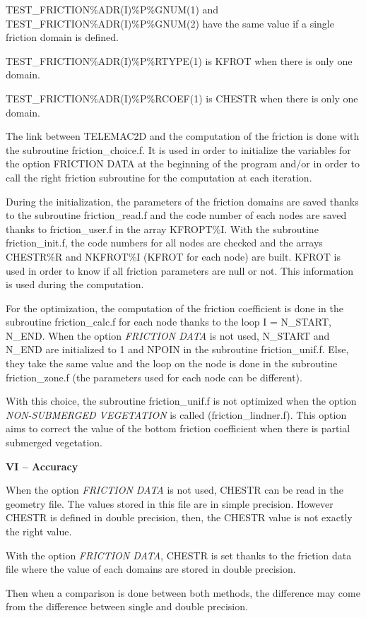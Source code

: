  TEST\_FRICTION\%ADR(I)\%P\%GNUM(1) and TEST\_FRICTION\%ADR(I)\%P\%GNUM(2) have the same value if a single friction domain is defined.

 TEST\_FRICTION\%ADR(I)\%P\%RTYPE(1) is KFROT   when there is only one domain.

 TEST\_FRICTION\%ADR(I)\%P\%RCOEF(1) is CHESTR when there is only one domain.



 The link between TELEMAC2D and the computation of the friction is done with the subroutine friction\_choice.f. It is used in order to initialize the variables for the option FRICTION  DATA at the beginning of the program and/or in order to call the right friction subroutine for the computation at each iteration.

 \textbf{}

 During the initialization, the parameters of the friction domains are saved thanks to the subroutine friction\_read.f and the code number of each nodes are saved thanks to friction\_user.f in the array KFROPT\%I. With the subroutine friction\_init.f, the code numbers for all nodes are checked and the arrays CHESTR\%R and NKFROT\%I (KFROT for each node) are built. KFROT is used in order to know if all friction parameters are null or not. This information is used during the computation.

 \textbf{}

 For the optimization, the computation of the friction coefficient is done in the subroutine friction\_calc.f for each node thanks to the loop I = N\_START, N\_END. When the option \textit{FRICTION DATA} is not used, N\_START and N\_END are initialized to 1 and NPOIN in the subroutine friction\_unif.f. Else, they take the same value and the loop on the node is done in the subroutine friction\_zone.f  (the  parameters used for each node can be different).

 With this choice, the subroutine friction\_unif.f is not optimized when the option \textit{NON-SUBMERGED VEGETATION} is called (friction\_lindner.f). This option aims to correct the value of the bottom friction coefficient when there is partial submerged vegetation.

 \textbf{VI -- Accuracy}

 When the option \textit{FRICTION DATA} is not used, CHESTR can be read in the geometry file. The values stored in this file are in simple precision. However CHESTR is defined in double precision, then, the CHESTR value is not exactly the right value.

 With the option \textit{FRICTION DATA}, CHESTR is set thanks to the friction data file where the value of each domains are stored in double precision.

 Then when a comparison is done between both methods, the difference may come from the difference between single and double precision.


